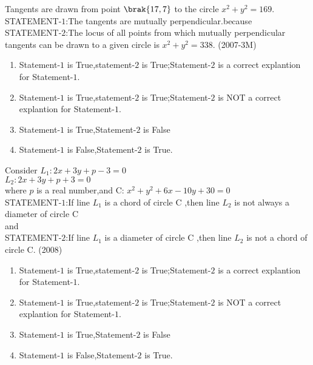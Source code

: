 
\iffalse
  \title{Assignment 1}
  \author{Srihaas Gunda}
  \section{ar}
\fi
\item Tangents are drawn from point $\brak{17 , 7}$ to the circle $x^2+y^2=169$.\\
STATEMENT-$1$:The tangents are mutually perpendicular.because\\
STATEMENT-$2$:The locus of all points from which mutually perpendicular tangents can be drawn to a given circle is $x^2+y^2=338$. \hfill(2007-3M)\\
\begin{enumerate}
\item Statement-$1$ is True,statement-$2$ is True;Statement-$2$ is a correct explantion for Statement-$1$.
\item Statement-$1$ is True,statement-$2$ is True;Statement-$2$ is NOT a correct explantion for Statement-$1$.
\item Statement-$1$ is True,Statement-$2$ is False
\item Statement-$1$ is False,Statement-$2$ is True.
\end{enumerate}

\item Consider $L_1:2x+3y+p-3=0$\\
               $L_2:2x+3y+p+3=0$\\
where $p$ is a real number,and C: $x^2+y^2+6x-10y+30=0$\\
STATEMENT-$1$:If line $L_1$ is a chord of circle C ,then line $L_2$ is not always a diameter of circle C\\
and\\
STATEMENT-$2$:If line $L_1$ is a diameter of circle C ,then line $L_2$ is not a chord  of circle C. \hfill(2008)\\
\begin{enumerate}
\item Statement-$1$ is True,statement-$2$ is True;Statement-$2$ is a correct explantion for Statement-$1$.
\item Statement-$1$ is True,statement-$2$ is True;Statement-$2$ is NOT a correct explantion for Statement-$1$.
\item Statement-$1$ is True,Statement-$2$ is False
\item Statement-$1$ is False,Statement-$2$ is True.	
\end{enumerate}

